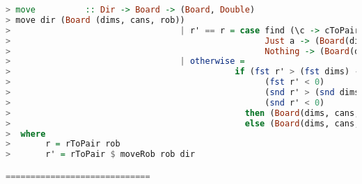 \documentclass[12pt,a4paper]{article}
\begin{document}
\begin{lstlisting}[language=Haskell,numbers=none,basicstyle=\tiny]
> move          :: Dir -> Board -> (Board, Double)
> move dir (Board (dims, cans, rob)) 
>                                  | r' == r = case find (\c -> cToPair c == r) cans of
>                                                   Just a -> (Board(dims, filter (\c -> cToPair c /= r) cans, rob), 10.0)
>                                                   Nothing -> (Board(dims, cans, rob), -1.0)
>                                  | otherwise = 
>                                             if (fst r' > (fst dims) -1 )      ||
>                                                   (fst r' < 0)                ||
>                                                   (snd r' > (snd dims) -1)    ||
>                                                   (snd r' < 0)        
>                                               then (Board(dims, cans, rob), -5.0)
>                                               else (Board(dims, cans, Rob r'), 0.0) 
>  where
>       r = rToPair rob
>       r' = rToPair $ moveRob rob dir

=============================
	\end{lstlisting}
	
\end{document}

